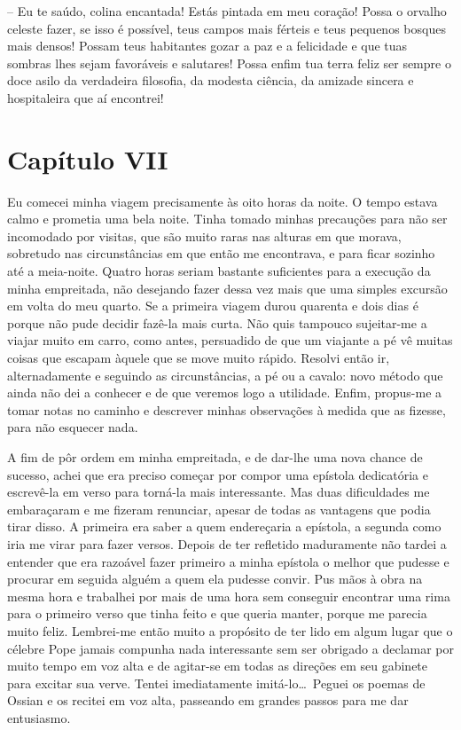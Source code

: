-- Eu te saúdo, colina encantada! Estás pintada em meu coração! Possa o
orvalho celeste fazer, se isso é possível, teus campos mais férteis e
teus pequenos bosques mais densos! Possam teus habitantes gozar a paz e
a felicidade e que tuas sombras lhes sejam favoráveis e salutares!
Possa enfim tua terra feliz ser sempre o doce asilo da verdadeira
filosofia, da modesta ciência, da amizade sincera e hospitaleira que aí
encontrei!

\section{Capítulo VII}

 Eu comecei minha viagem precisamente às oito horas da noite. O tempo
estava calmo e prometia uma bela noite. Tinha tomado minhas precauções
para não ser incomodado por visitas, que são muito raras nas alturas em
que morava, sobretudo nas circunstâncias em que então me encontrava, e
para ficar sozinho até a meia-noite. Quatro horas seriam bastante
suficientes para a execução da minha empreitada, não desejando fazer
dessa vez mais que uma simples excursão em volta do meu quarto. Se a
primeira viagem durou quarenta e dois dias é porque não pude decidir
fazê-la mais curta. Não quis tampouco sujeitar-me a viajar muito em
carro, como antes, persuadido de que um viajante a pé vê muitas coisas
que escapam àquele que se move muito rápido. Resolvi então ir,
alternadamente e seguindo as circunstâncias, a pé ou a cavalo: novo
método que ainda não dei a conhecer e de que veremos logo a utilidade.
Enfim, propus-me a tomar notas no caminho e descrever minhas
observações à medida que as fizesse, para não esquecer nada.

 A fim de pôr ordem em minha empreitada, e de dar-lhe uma nova chance de
sucesso, achei que era preciso começar por compor uma epístola
dedicatória e escrevê-la em verso para torná-la mais interessante. Mas
duas dificuldades me embaraçaram e me fizeram renunciar, apesar de
todas as vantagens que podia tirar disso. A primeira era saber a quem
endereçaria a epístola, a segunda como iria me virar para fazer versos.
Depois de ter refletido maduramente não tardei a entender que era
razoável fazer primeiro a minha epístola o melhor que pudesse e
procurar em seguida alguém a quem ela pudesse convir. Pus mãos à obra
na mesma hora e trabalhei por mais de uma hora sem conseguir encontrar
uma rima para o primeiro verso que tinha feito e que queria manter,
porque me parecia muito feliz. Lembrei-me então muito a propósito de
ter lido em algum lugar que o célebre Pope jamais compunha nada
interessante sem ser obrigado a declamar por muito tempo em voz alta e
de agitar-se em todas as direções em seu gabinete para excitar sua
verve. Tentei imediatamente imitá-lo\ldots\ Peguei os poemas de Ossian e os
recitei em voz alta, passeando em grandes passos para me dar
entusiasmo. 

